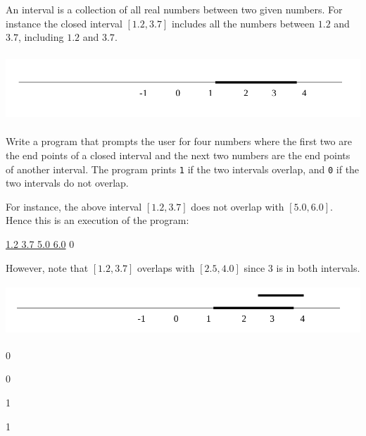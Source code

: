 An interval is a collection of all real numbers between two given numbers. For
instance the closed interval $[1.2, 3.7]$ includes all the numbers between
$1.2$ and $3.7$, including $1.2$ and $3.7$.

\includegraphics[width=6in, height=1in]{figure1.png}

Write a program that prompts the user for four numbers where the first two are 
the end points of a closed interval and the next two numbers are the end points
 of another interval. The program prints \verb!1! if the two intervals overlap,
and \verb!0! if the two intervals do not overlap.

For instance, the above interval $[1.2, 3.7]$ does not overlap with
$[5.0, 6.0]$. Hence this is an execution of the program:
\begin{console}[commandchars=\\\{\}]
\underline{1.2 3.7 5.0 6.0}
0
\end{console}

However, note that $[1.2, 3.7]$ overlaps with $[2.5, 4.0]$ since $3$ is in both
intervals.

\includegraphics[width=5.5in, height=0.75in]{figure2.png}

\resett
\nextt
\begin{console}[commandchars=\\\{\}]
0
\end{console}

\nextt
\begin{console}[commandchars=\\\{\}]
0
\end{console}

\nextt
\begin{console}[commandchars=\\\{\}]
1
\end{console}

\nextt
\begin{console}[commandchars=\\\{\}]
1
\end{console}

